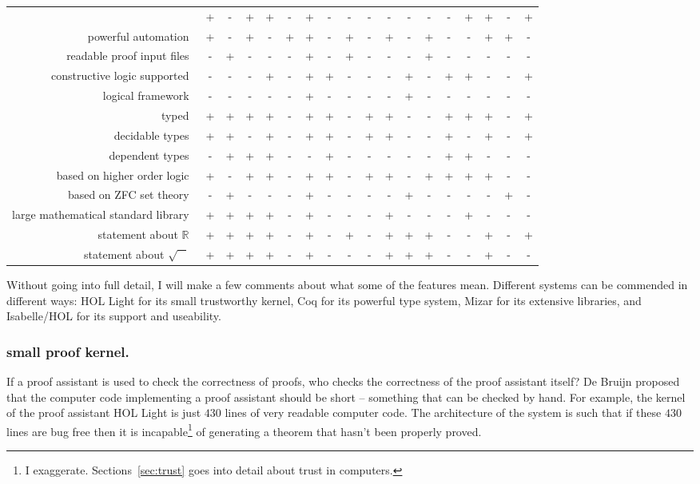 \documentclass{llncs}
\newcommand{\ring}[1]{\mathbb{#1}}
\begin{document}
\begin{tabular}{|r|ccccc|ccccc|ccccc|cc|}
&+ &- &+ &+  &- &+ &- &-  &- &- &- &-  &- &+ &+ &-  &+ 
\\
powerful automation~
&+ &- &+ &-  &+ &+ &- &+  &- &+ &- &+  &- &- &+ &+  &- 
\\
readable proof input files~
&- &+ &- &-  &- &+ &- &+  &- &- &- &+  &- &- &- &-  &- 
\\
\hline
constructive logic supported~
&- &- &- &+  &- &+ &+ &-  &- &- &+ &-  &+ &+ &- &-  &+ 
\\
logical framework~
&- &- &- &-  &- &+ &- &-  &- &- &+ &-  &- &- &- &-  &- 
\\
typed~
&+ &+ &+ &+  &- &+ &+ &-  &+ &+ &- &-  &+ &+ &+ &-  &+ 
\\
decidable types~
&+ &+ &- &+  &- &+ &+ &-  &+ &+ &- &-  &+ &- &+ &-  &+ 
\\
dependent types~
&- &+ &+ &+  &- &- &+ &-  &- &- &- &-  &+ &+ &- &-  &- 
\\
\hline
based on higher order logic~
&+ &- &+ &+  &- &+ &+ &-  &+ &+ &- &+  &+ &+ &+ &-  &- 
\\
based on ZFC set theory~
&- &+ &- &-  &- &+ &- &-  &- &- &+ &-  &- &- &- &+  &- 
\\
large mathematical standard library~
&+ &+ &+ &+  &- &+ &- &-  &- &+ &- &-  &- &+ &- &-  &- 
\\
statement about $\ring{R}$~
&+ &+ &+ &+  &- &+ &- &+  &- &+ &+ &+  &- &- &+ &-  &+ 
\\
statement about $\sqrt{\phantom X}$~
&+ &+ &+ &+  &- &+ &- &-  &- &+ &+ &+  &- &- &+ &-  &- 
\\
\hline
\end{tabular}


\bigskip 

Without going into full detail, I will make a few comments
about what some of the features mean.  Different systems can be
commended in different ways: HOL Light for its small trustworthy
kernel, Coq for its powerful type system, Mizar for its extensive
libraries, and Isabelle/HOL for its support and useability.


\subsubsection{small proof kernel.} If a proof assistant is used to
check the correctness of proofs, who checks the correctness of the
proof assistant itself?  De Bruijn proposed that the computer code
implementing a proof assistant should be short -- something that
can be checked by hand.  For example, the kernel of the proof
assistant HOL Light is just $430$ lines of very readable computer
code.  The architecture of the system is such that if these $430$
lines are bug free then it is incapable\footnote{I
  exaggerate. Sections~\ref{sec:trust} goes into detail about trust in
  computers.} of generating a theorem that hasn't been properly
proved.
\end{document}
